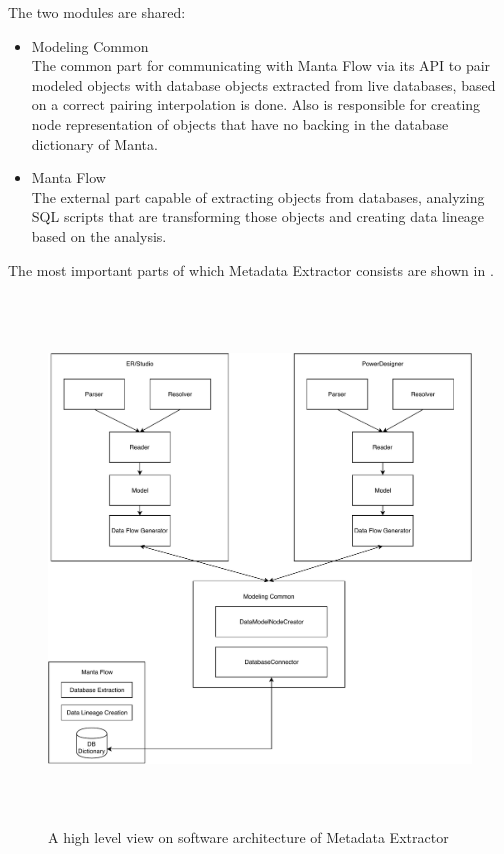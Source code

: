 The two modules are shared:
\begin{itemize}
	\item Modeling Common \\
	The common part for communicating with Manta Flow via its API to pair modeled objects with database objects extracted from live databases, based on a correct pairing interpolation is done. Also is responsible for creating node representation of objects that have no backing in the database dictionary of Manta.
	\item Manta Flow \\
	The external part capable of extracting objects from databases, analyzing SQL scripts that are transforming those objects and creating data lineage based on the analysis.
\end{itemize}

The most important parts of which Metadata Extractor consists are shown in .

\begin{figure}[H]
	\centering
	\includegraphics[height=14cm]{../img/SWArchitecture}
	\caption[Metadata Extractor Software Architecture]{A high level view on software architecture of Metadata Extractor}
	\label{SWArchitecture}
\end{figure}